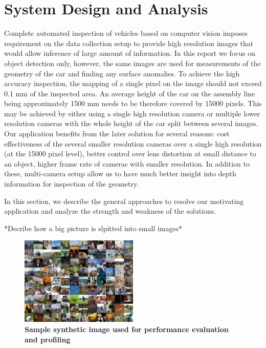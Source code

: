 \documentclass[conference]{IEEEtran}
\begin{document}
\section{System Design and Analysis}
Complete automated inspection of vehicles based on computer vision imposes requirement on the data collection setup to provide high resolution images that would allow inference of large amount of information. In this report we focus on object detection only, however, the same images are used for measurements of the geometry of the car and finding any surface anomalies. To achieve the high accuracy inspection, the mapping of a single pixel on the image should not exceed 0.1 mm of the inspected area. An average height of the car on the assembly line being approximately 1500 mm needs to be therefore covered by 15000 pixels. This may be achieved by either using a single high resolution camera or multiple lower resolution cameras with the whole height of the car split between several images. Our application benefits from the later solution for several reasons: cost effectiveness of the several smaller resolution cameras over a single high resolution (at the 15000 pixel level), better control over lens distortion at small distance to an object, higher frame rate of cameras with smaller resolution. In addition to these, multi-camera setup allow us to have much better insight into depth information for inspection of the geometry. 

In this section, we describe the general approaches to resolve our motivating application and analyze the strength and weakness of the solutions.

*Decribe how a big picture is slpitted into small images*
\begin{figure}[htpb]
	  \centering
	  \includegraphics[width=0.5\textwidth]{sample_image}
	  \caption{\textbf{Sample synthetic image used for  performance evaluation and profiling}}
	  \label{fig:sapmle_image}
\end{figure}
\end{document}
